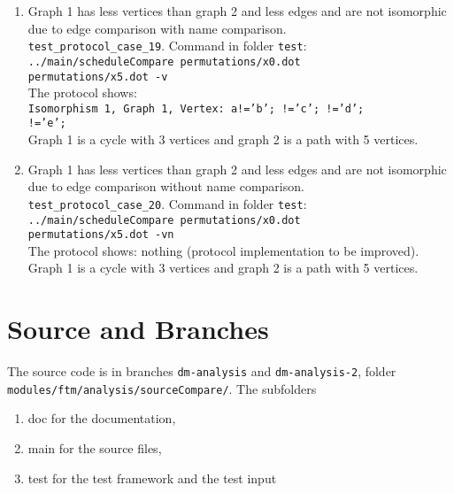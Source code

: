 \documentclass[12pt,a4paper]{report}
\begin{document}
\begin{enumerate}
{    compare: -1, key: par, value1: '', value2: '1'.} \\
    Vertices in graph 2 have a parameter value 1. Vertices in graph 1 have no parameter.
  \item Graph 1 has less vertices than graph 2 and less edges and are not isomorphic due to edge comparison with name comparison. \\
    \texttt{test\_protocol\_case\_19}. Command in folder \texttt{test}: \\
    \texttt{../main/scheduleCompare permutations/x0.dot \\ permutations/x5.dot -v} \\
    The protocol shows: \\
    \texttt{Isomorphism 1, Graph 1, Vertex: a!='b'; !='c'; !='d'; \\ !='e';} \\
    Graph 1 is a cycle with 3 vertices and graph 2 is a path with 5 vertices.
  \item Graph 1 has less vertices than graph 2 and less edges and are not isomorphic due to edge comparison without name comparison. \\
    \texttt{test\_protocol\_case\_20}. Command in folder \texttt{test}: \\
    \texttt{../main/scheduleCompare permutations/x0.dot \\ permutations/x5.dot -vn} \\
    The protocol shows: nothing (protocol implementation to be improved). \\
    Graph 1 is a cycle with 3 vertices and graph 2 is a path with 5 vertices.
\end{enumerate}

\chapter{Source and Branches}
The source code is in branches \texttt{dm-analysis} and \texttt{dm-analysis-2},
folder \texttt{modules/ftm/analysis/sourceCompare/}. The subfolders
\begin{enumerate}
  \item doc for the documentation,
  \item main for the source files,
  \item test for the test framework and the test input
\end{enumerate}
\end{document}
